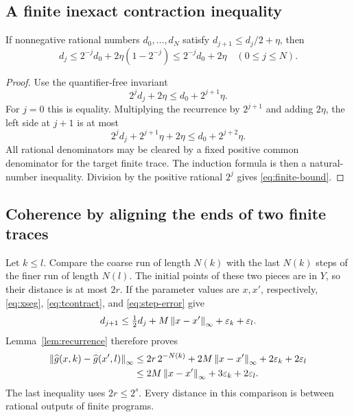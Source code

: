 \subsection{A finite inexact contraction inequality}

\begin{lemma}\label{lem:recurrence}
If nonnegative rational numbers \(d_0,\ldots,d_N\) satisfy
\(d_{j+1}\le d_j/2+\eta\), then
\begin{equation}\label{eq:finite-bound}
 d_j\le2^{-j}d_0+2\eta(1-2^{-j})\le2^{-j}d_0+2\eta
 \quad(0\le j\le N).
\end{equation}
\end{lemma}

\begin{proof}
Use the quantifier-free invariant
\begin{equation}\label{eq:scaled-inv}
 2^j d_j+2\eta\le d_0+2^{j+1}\eta.
\end{equation}
For \(j=0\) this is equality. Multiplying the recurrence by
\(2^{j+1}\) and adding \(2\eta\), the left side at \(j+1\)
is at most
\[
 2^j d_j+2^{j+1}\eta+2\eta
 \le d_0+2^{j+2}\eta.
\]
All rational denominators may be cleared by a fixed positive
common denominator for the target finite trace. The induction
formula is then a natural-number inequality. Division by the
positive rational \(2^j\) gives \eqref{eq:finite-bound}.
\end{proof}

\subsection{Coherence by aligning the ends of two finite traces}

Let \(k\le l\). Compare the coarse run of length \(N(k)\)
with the last \(N(k)\) steps of the finer run of length \(N(l)\).
The initial points of these two pieces are in \(Y\), so their
distance is at most \(2r\). If the parameter values are \(x,x'\),
respectively, \eqref{eq:xseg}, \eqref{eq:tcontract}, and
\eqref{eq:step-error} give
\[
 d_{j+1}\le\tfrac12d_j+
 M\left\lVert x-x'\right\rVert_\infty+\varepsilon_k+\varepsilon_l.
\]
Lemma~\ref{lem:recurrence} therefore proves
\begin{align}
 \left\lVert\widehat g(x,k)-\widehat g(x',l)\right\rVert_\infty
 &\le2r\,2^{-N(k)}
       +2M\left\lVert x-x'\right\rVert_\infty+2\varepsilon_k+2\varepsilon_l\nonumber\\
 &\le2M\left\lVert x-x'\right\rVert_\infty+3\varepsilon_k+2\varepsilon_l.
 \label{eq:pairbound}
\end{align}
The last inequality uses \(2r\le2^s\).
Every distance in this comparison is between rational outputs of
finite programs.

